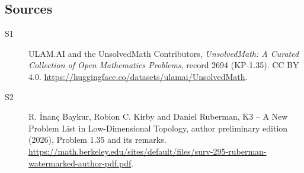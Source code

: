 \documentclass[11pt]{article}
\begin{document}
\subsection{Sources}
\begin{description}
\item[\hypertarget{source:2694:1}{S1}] ULAM.AI and the UnsolvedMath Contributors, \emph{UnsolvedMath: A Curated Collection of Open Mathematics Problems}, record 2694 (KP-1.35). CC BY 4.0. \url{https://huggingface.co/datasets/ulamai/UnsolvedMath}.
\item[\hypertarget{source:2694:2}{S2}] R. \.{I}nan\c{c} Baykur, Robion C. Kirby and Daniel Ruberman, K3 -- A New Problem List in Low-Dimensional Topology, author preliminary edition (2026), Problem 1.35 and its remarks. \url{https://math.berkeley.edu/sites/default/files/surv-295-ruberman-watermarked-author-pdf.pdf}.
\end{description}
\label{end:2694}
\end{document}

